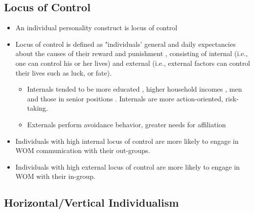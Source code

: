 \documentclass[
]{book}
\begin{document}
\hypertarget{locus-of-control}{%
\subsection{Locus of Control}\label{locus-of-control}}

\citep{lam2005}

\begin{itemize}
\item
  An individual personality construct is locus of control
\item
  Locus of control is defined as "individuals' general and daily expectancies about the causes of their reward and punishment \citep[pp.~216]{lam2005}, consisting of internal (i.e., one can control his or her lives) and external (i.e., external factors can control their lives such as luck, or fate).

  \begin{itemize}
  \item
    Internals tended to be more educated \citep{lachman1989}, higher household incomes \citep{hoffman2003}, men and those in senior positions \citep{smith1997}. Internals are more action-oriented, risk-taking.
  \item
    Externals perform avoidance behavior, greater needs for affiliation
  \end{itemize}
\end{itemize}

\begin{itemize}
\item
  Individuals with high internal locus of control are more likely to engage in WOM communication with their out-groups.
\item
  Individuals with high external locus of control are more likely to engage in WOM with their in-group.
\end{itemize}

\hypertarget{horizontalvertical-individualism}{%
\subsection{Horizontal/Vertical Individualism}\label{horizontalvertical-individualism}}

\citep{choi2019}
\end{document}
